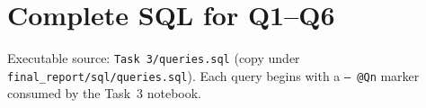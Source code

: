 \section{Complete SQL for Q1--Q6}
\label{app:queries}

Executable source: \texttt{Task 3/queries.sql} (copy under \texttt{final\_report/sql/queries.sql}).
Each query begins with a \texttt{-- @Qn} marker consumed by the Task~3 notebook.


